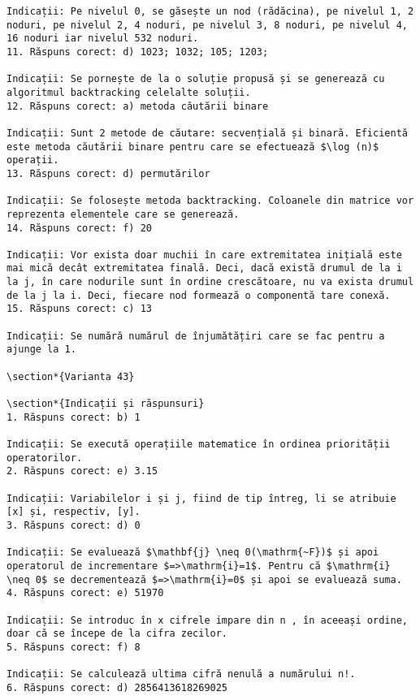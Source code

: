\begin{verbatim}
Indicații: Pe nivelul 0, se găsește un nod (rădăcina), pe nivelul 1, 2 noduri, pe nivelul 2, 4 noduri, pe nivelul 3, 8 noduri, pe nivelul 4, 16 noduri iar nivelul 532 noduri.
11. Răspuns corect: d) 1023; 1032; 105; 1203;

Indicații: Se pornește de la o soluție propusă și se generează cu algoritmul backtracking celelalte soluții.
12. Răspuns corect: a) metoda căutării binare

Indicații: Sunt 2 metode de căutare: secvențială și binară. Eficientă este metoda căutării binare pentru care se efectuează $\log (n)$ operații.
13. Răspuns corect: d) permutărilor

Indicații: Se folosește metoda backtracking. Coloanele din matrice vor reprezenta elementele care se generează.
14. Răspuns corect: f) 20

Indicații: Vor exista doar muchii în care extremitatea inițială este mai mică decât extremitatea finală. Deci, dacă există drumul de la i la j, în care nodurile sunt în ordine crescătoare, nu va exista drumul de la j la i. Deci, fiecare nod formează o componentă tare conexă.
15. Răspuns corect: c) 13

Indicații: Se numără numărul de înjumătățiri care se fac pentru a ajunge la 1.

\section*{Varianta 43}

\section*{Indicații și răspunsuri}
1. Răspuns corect: b) 1

Indicații: Se execută operațiile matematice în ordinea priorității operatorilor.
2. Răspuns corect: e) 3.15

Indicații: Variabilelor i și j, fiind de tip întreg, li se atribuie [x] și, respectiv, [y].
3. Răspuns corect: d) 0

Indicații: Se evaluează $\mathbf{j} \neq 0(\mathrm{~F})$ și apoi operatorul de incrementare $=>\mathrm{i}=1$. Pentru că $\mathrm{i} \neq 0$ se decrementează $=>\mathrm{i}=0$ și apoi se evaluează suma.
4. Răspuns corect: e) 51970

Indicații: Se introduc în x cifrele impare din n , în aceeași ordine, doar că se începe de la cifra zecilor.
5. Răspuns corect: f) 8

Indicații: Se calculează ultima cifră nenulă a numărului n!.
6. Răspuns corect: d) 2856413618269025


\end{verbatim}
